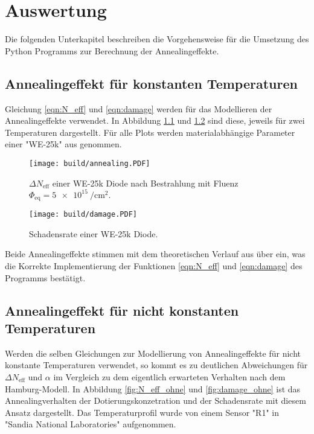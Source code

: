 \chapter{Auswertung}\label{make}
Die folgenden Unterkapitel beschreiben die Vorgehensweise für die Umsetzung des Python Programms zur
Berechnung der Annealingeffekte.
\section{Annealingeffekt für konstanten Temperaturen}
Gleichung \ref{eqn:N_eff} und \ref{eqn:damage}  werden für das Modellieren der Annealingeffekte verwendet. In
Abbildung \ref{fig:N_eff} und \ref{fig:damage} sind diese, jeweils für zwei Temperaturen dargestellt.
Für alle Plots werden materialabhängige
Parameter einer "WE-25k" aus \cite{moll} genommen.

\begin{figure}
    \texttt{[image: build/annealing.PDF]}
    \caption{$\Delta N_{\mathrm{eff}}$ einer WE-25k Diode nach Bestrahlung mit Fluenz $\Phi_{\mathrm{eq}} = \SI{5e15}{\per\centi\meter\squared}.$}
    \label{fig:N_eff}
\end{figure}

\begin{figure}
    \texttt{[image: build/damage.PDF]}
    \caption{Schadensrate einer WE-25k Diode.}
    \label{fig:damage}
\end{figure}

Beide Annealingeffekte stimmen mit dem theoretischen Verlauf aus \cite{moll} über ein, was
die Korrekte Implementierung der Funktionen \ref{eqn:N_eff} und \ref{eqn:damage}  des Programms
bestätigt.



\section{Annealingeffekt für nicht konstanten Temperaturen}{\label{nicht_konstant}}
Werden die selben Gleichungen zur Modellierung von Annealingeffekte für nicht
konstante Temperaturen verwendet, so kommt es zu deutlichen Abweichungen für
$\Delta N_{\mathrm{eff}}$ und $\alpha$ im Vergleich zu dem eigentlich erwarteten
Verhalten nach dem Hamburg-Modell. In Abbildung \ref{fig:N_eff_ohne} und \ref{fig:damage_ohne} ist das Annealingverhalten
der Dotierungskonzetration und der Schadensrate mit
diesem Ansatz dargestellt. Das Temperaturprofil wurde von einem Sensor "R1" in
"Sandia National Laboratories" aufgenommen.

